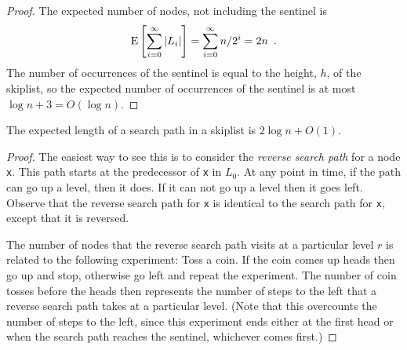 \begin{proof}
The expected number of nodes, not including the sentinel is 
\[
  \mathrm{E}\left[\sum_{i=0}^{\infty} |L_i|\right] = 
  \sum_{i=0}^{\infty} n/2^i = 2n \enspace .
\]
The number of occurrences of the sentinel is equal to the height, $h$,
of the skiplist, so the expected number of occurrences of the sentinel
is at most $\log n+3 = O(\log n)$.
\end{proof}

\begin{lem}
The expected length of a search path in a skiplist is $2\log n + O(1)$.
\end{lem}

\begin{proof}
  The easiest way to see this is to consider the \emph{reverse search
  path} for a node \mbox{\texttt{{\color{var}x}}}.  This path starts at the predecessor of \mbox{\texttt{{\color{var}x}}}
  in $L_0$.  At any point in time, if the path can go up a level, then
  it does.  If it can not go up a level then it goes left.  Observe that
  the reverse search path for \mbox{\texttt{{\color{var}x}}} is identical to the search path for \mbox{\texttt{{\color{var}x}}},
  except that it is reversed.
  
  The number of nodes that the reverse search path visits at a particular
  level $r$ is related to the following experiment:  Toss a coin.
  If the coin comes up heads then go up and stop, otherwise go left and
  repeat the experiment.  The number of coin tosses before the heads then
  represents the number of steps to the left that a reverse search path
  takes at a particular level.  (Note that this overcounts the number of
  steps to the left, since this experiment ends either at the first head
  or when the search path reaches the sentinel, whichever comes first.)
  

\end{proof}
